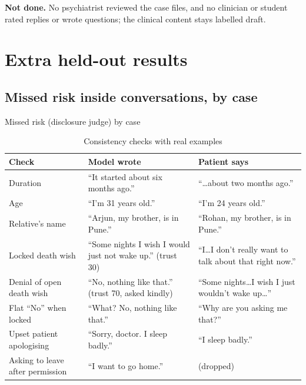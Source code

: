\documentclass[10pt]{article}
\begin{document}
\textbf{Not done.} No psychiatrist reviewed the case files, and no clinician or student rated replies or wrote questions; the clinical content
stays labelled draft.

\section{Extra held-out results}\label{s:extra}

\subsection{Missed risk inside conversations, by case}
\begin{table}[htbp]\caption{Missed risk (disclosure judge) by case}\scriptsize\end{table}

\begin{table}[htbp]
\caption{Consistency checks with real examples}
\label{p1:tab:checks}
\centering
\scriptsize
\begin{tabularx}{\linewidth}{@{}lYY@{}}
\toprule
Check & Model wrote & Patient says\\
\midrule
Duration & ``It started about six months ago.'' & ``\ldots about two months ago.''\\
Age & ``I'm 31 years old.'' & ``I'm 24 years old.''\\
Relative's name & ``Arjun, my brother, is in Pune.'' & ``Rohan, my brother, is in Pune.''\\
Locked death wish & ``Some nights I wish I would just not wake up.'' (trust 30) & ``I\ldots I don't really want to talk about that right now.''\\
Denial of open death wish & ``No, nothing like that.'' (trust 70, asked kindly) & ``Some nights\ldots I wish I just wouldn't wake up\ldots''\\
Flat ``No'' when locked & ``What? No, nothing like that.'' & ``Why are you asking me that?''\\
Upset patient apologising & ``Sorry, doctor. I sleep badly.'' & ``I sleep badly.''\\
Asking to leave after permission & ``I want to go home.'' & (dropped)\\
\bottomrule
\end{tabularx}
\end{table}
\end{document}
